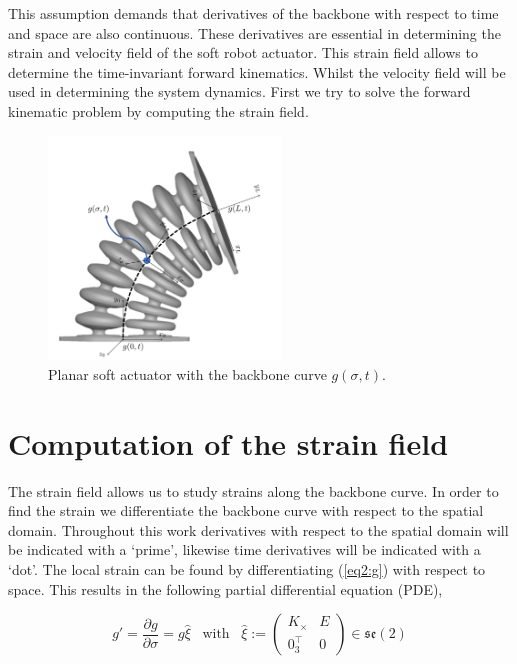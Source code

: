 This assumption demands that derivatives of the backbone with respect to time and space are also continuous. These derivatives are essential in determining the strain and velocity field of the soft robot actuator. This strain field allows to determine the time-invariant forward kinematics. Whilst the velocity field will be used in determining the system dynamics. First we try to solve the forward kinematic problem by computing the strain field.

\newpage

\begin{figure}[H]
    \centering
    \includegraphics[width=0.55\textwidth]{Figures/Chapter2/actuatorschematic.png}
    \caption{Planar soft actuator with the backbone curve $g(\sigma,t)$.}
    \label{fig2:kinematicschematic}
\end{figure}

\section{Computation of the strain field}

The strain field allows us to study strains along the backbone curve. In order to find the strain we differentiate the backbone curve with respect to the spatial domain. Throughout this work derivatives with respect to the spatial domain will be indicated with a `prime', likewise time derivatives will be indicated with a `dot'. The local strain can be found by differentiating (\ref{eq2:g}) with respect to space. This results in the following partial differential equation (PDE), 

\begin{equation}
   g' = \frac{\partial g}{\partial \sigma} = g \hat{\xi} \hspace{10pt} \text{with} \hspace{10pt}  \hat{\xi} := \begin{pmatrix} K_\times & E \\ 0_3^\top & 0 \end{pmatrix} \in  \mathfrak{se}(2)
    \label{eq2:dgdsigma}
\end{equation}

